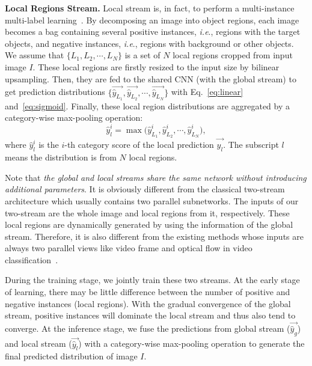 \documentclass[journal]{IEEEtran}
\makeatletter
\DeclareRobustCommand\onedot{\@onedot}
\def\@onedot{.}
\def\ie{\emph{i.e}\onedot}
\makeatother
\begin{document}
\noindent \textbf{Local Regions Stream.} 
Local stream is, in fact, to perform a multi-instance multi-label learning~\cite{zhou2012multi}. By decomposing an image into object regions, each image becomes a bag containing several positive instances, \ie, regions
with the target objects, and negative instances, \ie, regions with background or other objects. We assume that $\{L_1, L_2, \cdots, L_N\}$ is a set of $N$ local regions cropped from input image $I$. These local regions are firstly resized to the input size by bilinear upsampling. Then, they are fed to the shared CNN (with the global stream) to get prediction distributions $\{\vec {\hat {y}_{L_1}}, \vec {\hat {y}_{L_2}}, \cdots, \vec {\hat {y}_{L_N}}\}$ with Eq.~\ref{eq:linear} and~\ref{eq:sigmoid}. Finally, these local region distributions are aggregated by a category-wise max-pooling operation:
 \begin{equation}\label{eq:classmax}
 \hat {y}_l^i = \max \big(\hat y_{L_1}^i , \hat y_{L_2}^i , \cdots, \hat y_{L_N}^i \big),
 \end{equation}
where $\hat {y}_l^i$ is the $i$-th category score of the local prediction $\vec {\hat {y}_l}$. The subscript $l$ means the distribution is from $N$ local regions.

Note that \emph{the global and local streams share the same network without introducing additional parameters}. It is obviously different from the classical two-stream architecture which usually contains two parallel subnetworks. The inputs of our two-stream are the whole image and local regions from it, respectively. These local regions are dynamically generated by using the information of the global stream. Therefore, it is also different from the existing methods whose inputs are always two parallel views like video frame and optical flow in video classification~\cite{Simonyan14}.

During the training stage, we jointly train these two streams. At the early stage of learning, there may be little difference between the number of positive and negative instances (local regions). With the gradual convergence of the global stream, positive instances will dominate the local stream and thus also tend to converge.  At the inference stage, we fuse the predictions from global stream ($\vec {\hat {y}_g}$) and local stream ($\vec {\hat {y}_l}$) with a category-wise max-pooling operation to generate the final predicted distribution of image $I$.

 
\end{document}
